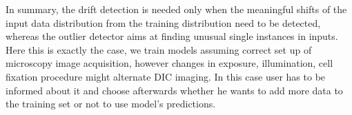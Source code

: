 In summary, the drift detection is needed only when the meaningful shifts of the input data distribution from the training distribution need to be detected, whereas the outlier detector aims at finding unusual single instances in inputs. Here this is exactly the case, we train models assuming correct set up  of microscopy image acquisition, however changes in exposure, illumination, cell fixation procedure might alternate DIC imaging. In this case user has to be informed about it and choose afterwards whether he wants to add more data to the training set or not to use model's predictions.
